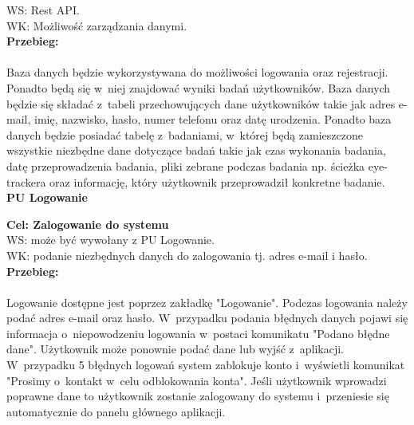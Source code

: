\documentclass[12pt, letterpaper]{article}
\begin{document}
		WS: Rest API.\\
		
		WK: Możliwość zarządzania danymi.\\
		
		\textbf{Przebieg: }
\paragraph{}Baza danych będzie wykorzystywana do możliwości logowania oraz rejestracji. Ponadto będą się w~niej znajdować wyniki badań użytkowników. Baza danych będzie się składać z~tabeli przechowujących dane użytkowników takie jak adres e-mail, imię, nazwisko, hasło, numer telefonu oraz datę urodzenia. Ponadto baza danych będzie posiadać tabelę z~badaniami, w~której będą zamieszczone wszystkie niezbędne dane dotyczące badań takie jak czas wykonania badania, datę przeprowadzenia badania, pliki zebrane podczas badania np. ścieżka eye-trackera oraz informację, który użytkownik przeprowadził konkretne badanie.\\
		
		
		\textbf{PU Logowanie}
		
		\quad
		
		\textbf{Cel: Zalogowanie do systemu}\\
		
		WS: może być wywołany z PU Logowanie.\\
		
		WK: podanie niezbędnych danych do zalogowania tj. adres e-mail i hasło.\\
		
		\textbf{Przebieg:}
\paragraph{}Logowanie dostępne jest poprzez zakładkę "Logowanie". Podczas logowania należy podać adres e-mail oraz hasło. W~przypadku podania błędnych danych pojawi się informacja o~niepowodzeniu logowania w~postaci komunikatu "Podano błędne dane". Użytkownik może ponownie podać dane lub wyjść z~aplikacji. W~przypadku 5 błędnych logowań system zablokuje konto i~wyświetli komunikat "Prosimy o~kontakt w~celu odblokowania konta". Jeśli użytkownik wprowadzi poprawne dane to użytkownik zostanie zalogowany do systemu i~przeniesie się automatycznie do panelu głównego aplikacji.\\
		
\end{document}
